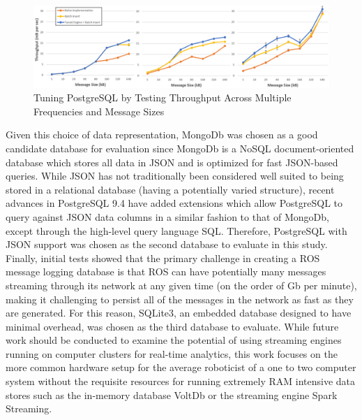 \documentclass[nocopyrightspace]{acm_proc_article-sp}
\begin{document}
\begin{figure}
    \centering
    \includegraphics[width=\linewidth]{images/tuning}
    \caption{Tuning PostgreSQL by Testing Throughput Across Multiple Frequencies and Message Sizes}
    \label{fig:tuning}
\end{figure}

Given this choice of data representation, MongoDb was chosen as a good candidate database for evaluation since MongoDb is a NoSQL document-oriented database which stores all data in JSON and is optimized for fast JSON-based queries. While JSON has not traditionally been considered well suited to being stored in a relational database (having a potentially varied structure), recent advances in PostgreSQL 9.4 have added extensions which allow PostgreSQL to query against JSON data columns in a similar fashion to that of MongoDb, except through the high-level query language SQL. Therefore, PostgreSQL with JSON support was chosen as the second database to evaluate in this study. Finally, initial tests showed that the primary challenge in creating a ROS message logging database is that ROS can have potentially many messages streaming through its network at any given time (on the order of Gb per minute), making it challenging to persist all of the messages in the network as fast as they are generated. For this reason, SQLite3, an embedded database designed to have minimal overhead, was chosen as the third database to evaluate. While future work should be conducted to examine the potential of using streaming engines running on computer clusters for real-time analytics, this work focuses on the more common hardware setup for the average roboticist of a one to two computer system without the requisite resources for running extremely RAM intensive data stores such as the in-memory database VoltDb or the streaming engine Spark Streaming.
\end{document}
